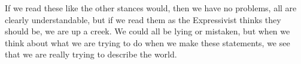 If we read these like the other stances would, then we have no problems, all are clearly understandable, but if we read them as the Expressivist thinks they should be, we are up a creek. We could all be lying or mistaken, but when we think about what we are trying to do when we make these statements, we see that we are really trying to describe the world. 